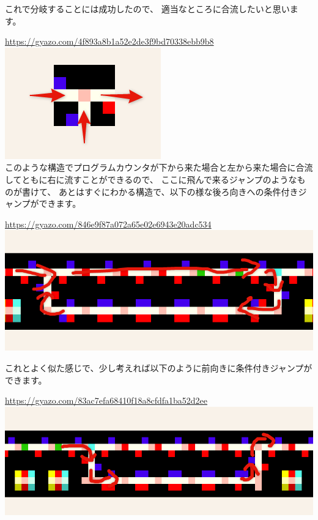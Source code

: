 これで分岐することには成功したので、
適当なところに合流したいと思います。

\url{https://gyazo.com/4f893a8b1a52e2de3f9bd70338ebb9b8}\\
\href{https://gyazo.com/4f893a8b1a52e2de3f9bd70338ebb9b8}{\includegraphics{images/4f893a8b1a52e2de3f9bd70338ebb9b8.png}} \\
このような構造でプログラムカウンタが下から来た場合と左から来た場合に合流してともに右に流すことができるので、
ここに飛んで来るジャンプのようなものが書けて、
あとはすぐにわかる構造で、以下の様な後ろ向きへの条件付きジャンプができます。

\url{https://gyazo.com/846e9f87a072a65e02e6943e20adc534}\\
\href{https://gyazo.com/846e9f87a072a65e02e6943e20adc534}{\includegraphics[width=\textwidth]{images/846e9f87a072a65e02e6943e20adc534.png}}

これとよく似た感じで、少し考えれば以下のように前向きに条件付きジャンプができます。

\url{https://gyazo.com/83ac7efa68410f18a8cfdfa1ba52d2ee}\\
\href{https://gyazo.com/83ac7efa68410f18a8cfdfa1ba52d2ee}{\includegraphics[width=\textwidth]{images/83ac7efa68410f18a8cfdfa1ba52d2ee.png}}

